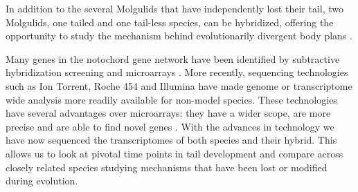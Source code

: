 In addition to the several Molgulids that have independently lost their tail, two Molgulids, one tailed and one tail-less species, can be hybridized, offering the opportunity to study the mechanism behind evolutionarily divergent body plans \cite{jeffery_evolutionary_1991}. %

Many genes in the notochord gene network have been identified by subtractive hybridization screening and microarrays \cite{jeffery_factors_1992,hotta_characterization_2000,gyoja_analysis_2007,kobayashi_differential_2013}. More recently, sequencing technologies such as Ion Torrent, Roche 454 and Illumina have made genome or transcriptome wide analysis more readily available for non-model species. These technologies have several advantages over microarrays: they have a wider scope, are more precise and are able to find novel genes \cite{marioni_rna-seq:_2008}. With the advances in technology we have now sequenced the transcriptomes of both species and their hybrid. This allows us to look at pivotal time points in tail development and compare across closely related species studying mechanisms that have been lost or modified during evolution. 

